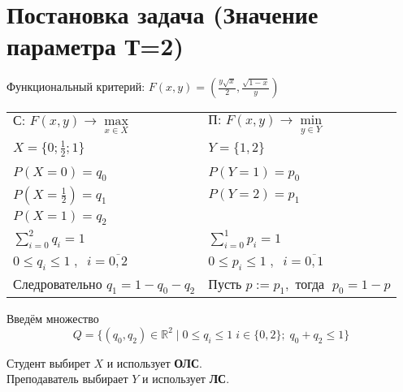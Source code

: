 \section{Постановка задача (Значение параметра Т=2)}

\begin{flushleft}

	Функциональный критерий: 
	$F(x, y) = (\frac{y\sqrt{x}}{2},\frac{\sqrt{1-x}}{y})$
	

	
	\begin{center}
	\begin{tabu} to 0.8 \textwidth {X[c] X[c]}
		$\textrm{С:  }F(x, y) \rightarrow \max \limits_{x\in X}$	&
		$\textrm{П:  }F(x, y) \rightarrow \min \limits_{y \in Y}$ \\
		$X = \{ 0; \frac{1}{2}; 1\}$ & $Y = \{1, 2\}$	\\
		\\
		$P(X=0)=q_0$ & $P(Y=1)=p_0$ \\
		$P(X=\frac{1}{2})=q_1$ & $P(Y=2)=p_1$ \\
		$P(X=1)=q_2$ & 
		\\
		$\sum \limits_{i=0}^2 q_i=1$ & $\sum \limits_{i=0}^1 p_i=1$ \\
		$0 \leqslant q_i \leqslant 1 \;,\;\; i=\overline{0,2}$ &
		$0 \leqslant p_i \leqslant 1 \;,\;\; i=\overline{0,1}$  \\
		\\
		$\textrm{Следровательно  } q_1 = 1-q_0-q_2$ & 
		$\textrm{Пусть  } p := p_1, \textrm{ тогда }\; p_0=1-p$ 
	\end{tabu}	
	\end{center}

	Введём множество 
	\begin{equation}
		Q=\{(q_0,q_2) \in \mathbb{R}^2 \; | \;
		0 \leqslant q_i \leqslant 1 \; i\in\{0,2\}; \; 
		q_0 + q_2 \leqslant 1\}	
	\end{equation}


	Студент выбирет $X$ и использует \textbf{ОЛС}. \\
	Преподаватель выбирает $Y$ и использует \textbf{ЛС}.\\
\end{flushleft}
